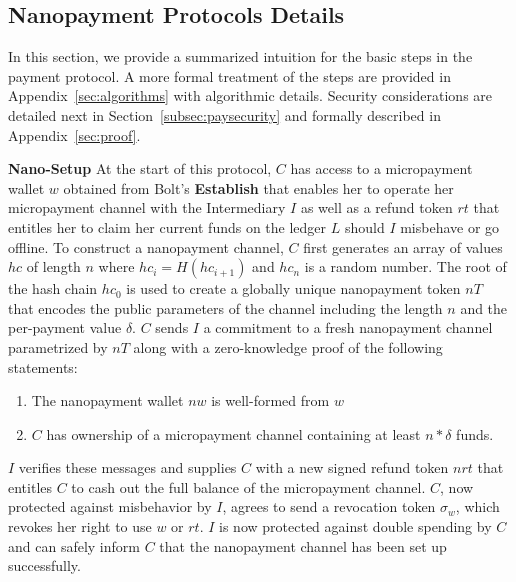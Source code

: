 \subsection{Nanopayment Protocols Details}
\label{sec:nanopaymentdetails}
In this section, we provide a summarized intuition for the basic steps in the
payment protocol. A more formal treatment of the steps are provided in
Appendix~\ref{sec:algorithms} with algorithmic details. Security considerations
are detailed next in Section~\ref{subsec:paysecurity} and formally
described in Appendix~\ref{sec:proof}.


\textbf{Nano-Setup} At the start of this protocol, $C$ has access to a
micropayment wallet $w$ obtained from Bolt's \textbf{Establish} that enables her to operate her micropayment channel
with the Intermediary $I$ as well as a refund token $rt$ that entitles her to claim her current
funds on the ledger $L$ should $I$ misbehave or go offline. To construct a nanopayment
channel, $C$ first generates an array of values $hc$ of length $n$ where
$hc_i = H(hc_{i+1})$ and $hc_n$ is a random number. The root of the hash chain
$hc_0$ is used to create a globally unique nanopayment token $nT$ that encodes
the public parameters of the channel including the length $n$ and the
per-payment value $\delta$. $C$ sends $I$ a commitment to a fresh nanopayment
channel parametrized by $nT$ along with a zero-knowledge proof of the following
statements:

\begin{enumerate}
\item The nanopayment wallet $nw$ is well-formed from $w$
\item $C$ has ownership of a micropayment channel containing at least $n *
  \delta$ funds.
\end{enumerate}

$I$ verifies these messages and supplies $C$ with a new signed refund token
$nrt$ that entitles $C$ to cash out the full balance of the micropayment channel.
$C$, now protected against misbehavior by
$I$, agrees to send a revocation token $\sigma_w$, which revokes her right to
use $w$ or $rt$. $I$ is now protected against double spending by $C$ and can
safely inform $C$ that the nanopayment channel has been set up successfully.

